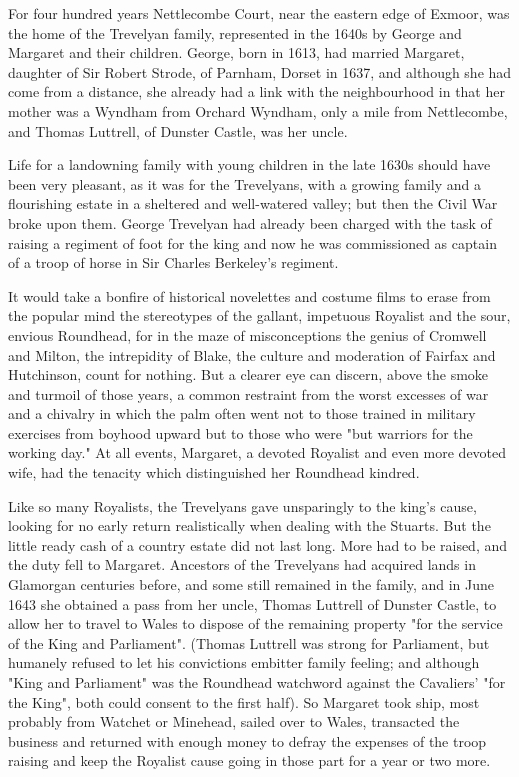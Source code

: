 
For four hundred years Nettlecombe Court, near the eastern edge of Exmoor, was the home of the Trevelyan family, represented in the 1640s by George and Margaret and their children. George, born in 1613, had married Margaret, daughter of Sir Robert Strode, of Parnham, Dorset in 1637, and although she had come from a distance, she already had a link with the neighbourhood in that her mother was a Wyndham from Orchard Wyndham, only a mile from Nettlecombe, and Thomas Luttrell, of Dunster Castle, was her uncle.

Life for a landowning family with young children in the late 1630s should have been very pleasant, as it was for the Trevelyans, with a growing family and a flourishing estate in a sheltered and well-watered valley; but then the Civil War broke upon them. George Trevelyan had already been charged with the task of raising a regiment of foot for the king and now he was commissioned as captain of a troop of horse in Sir Charles Berkeley's regiment. 

It would take a bonfire of historical novelettes and costume films to erase from the popular mind the stereotypes of the gallant, impetuous Royalist and the sour, envious Roundhead, for in the maze of misconceptions the genius of Cromwell and Milton, the intrepidity of Blake, the culture and moderation of Fairfax and Hutchinson, count for nothing. But a clearer eye can discern, above the smoke and turmoil of those years, a common restraint from the worst excesses of war and a chivalry in which the palm often went not to those trained in military exercises from boyhood upward but to those who were "but warriors for the working day." At all events, Margaret, a devoted Royalist and even more devoted wife, had the tenacity which distinguished her Roundhead kindred. 

Like so many Royalists, the Trevelyans gave unsparingly to the king's cause, looking for no early return   realistically when dealing with the Stuarts. But the little ready cash of a country estate did not last long. More had to be raised, and the duty fell to Margaret. Ancestors of the Trevelyans had acquired lands in Glamorgan centuries before, and some still remained in the family, and in June 1643 she obtained a pass from her uncle, Thomas Luttrell of Dunster Castle, to allow her to travel to Wales to dispose of the remaining property "for the service of the King and Parliament". (Thomas Luttrell was strong for Parliament, but humanely refused to let his convictions embitter family feeling; and although "King and Parliament" was the Roundhead watchword against the Cavaliers' "for the King", both could consent to the first half). So Margaret took ship, most probably from Watchet or Minehead, sailed over to Wales, transacted the business and returned with enough money to defray the expenses of the troop raising and keep the Royalist cause going in those part for a year or two more. 


